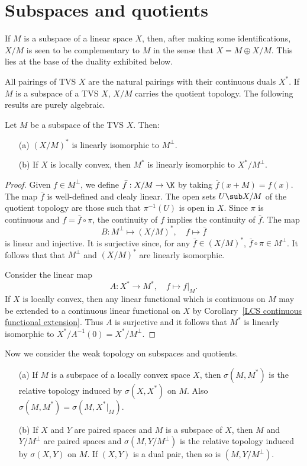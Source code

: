 \section{Subspaces and quotients}
If $M$ is a subspace of a linear space $X$, then, after making some identifications, $X/M$ is seen to be complementary to $M$ in the sense that $X=M\oplus X/M$. This lies at the base of the duality exhibited below.\par
All pairings of TVS $X$ are the natural pairings with their continuous duals $X^*$. If $M$ is a subspace of a TVS $X$, $X/M$ carries the quotient topology. The following results are purely algebraic.
\begin{proposition}\label{dual of subspace and quotient}
Let $M$ be a subspace of the TVS $X$. Then:
\begin{itemize}
\item[(a)] $(X/M)^*$ is linearly isomorphic to $M^\bot$.
\item[(b)] If $X$ is locally convex, then $M^*$ is linearly isomorphic to $X^*/M^\bot$.
\end{itemize}
\end{proposition}
\begin{proof}
Given $f\in M^\bot$, we define $\bar{f}:X/M\to\K$ by taking $\bar{f}(x+M)=f(x)$. The map $\bar{f}$ is well-defined and clealy linear. The open sets $U\sub X/M$ of the quotient topology are those such that $\pi^{-1}(U)$ is open in $X$. Since $\pi$ is continuous and $f=\bar{f}\circ\pi$, the continuity of $f$ implies the continuity of $\bar{f}$. The map
\[B:M^\bot\mapsto(X/M)^*,\quad f\mapsto\bar{f}\]
is linear and injective. It is surjective since, for any $\bar{f}\in(X/M)^*$, $\bar{f}\circ\pi\in M^\bot$. It follows that that $M^\bot$ and $(X/M)^*$ are linearly isomorphic.\par
Consider the linear map
\[A:X^*\to M^*,\quad f\mapsto f|_M.\]
If $X$ is locally convex, then any linear functional which is continuous on $M$ may be extended to a continuous linear functional on $X$ by Corollary~\ref{LCS continuous functional extension}. Thus $A$ is surjective and it follows that $M^*$ is linearly isomorphic to $X^*/A^{-1}(0)=X^*/M^\bot$.
\end{proof}
Now we consider the weak topology on subspaces and quotients.
\begin{proposition}\label{weak topo subspace}
\mbox{}
\begin{itemize}
\item[(a)] If $M$ is a subspace of a locally convex space $X$, then $\sigma(M,M^*)$ is the relative topology induced by $\sigma(X,X^*)$ on $M$. Also $\sigma(M,M^*)=\sigma(M,X^*|_M)$.
\item[(b)] If $X$ and $Y$ are paired spaces and $M$ is a subspace of $X$, then $M$ and $Y/M^\bot$ are paired spaces and $\sigma(M,Y/M^\bot)$ is the relative topology induced by $\sigma(X,Y)$ on $M$. If $(X,Y)$ is a dual pair, then so is $(M,Y/M^\bot)$.
\end{itemize}
\end{proposition}
